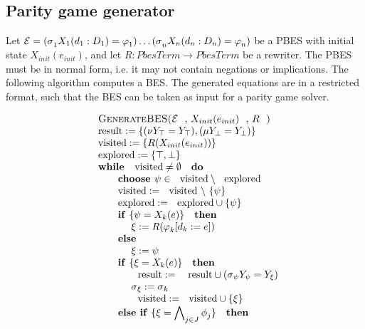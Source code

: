 \documentclass{article}
\begin{document}
\subsection{Parity game generator}

Let $\mathcal{E=(\sigma }_{1}X_{1}(d_{1}:D_{1})=\varphi _{1})\ldots \mathcal{%
(\sigma }_{n}X_{n}(d_{n}:D_{n})=\varphi _{n})$ be a PBES with initial state $%
X_{init}(e_{init})$, and let $R:PbesTerm\rightarrow PbesTerm$ be a rewriter.
The PBES must be in normal form, i.e. it may not contain negations or
implications. The following algorithm computes a BES. The generated
equations are in a restricted format, such that the BES can be taken as
input for a parity game solver.

{\small 
\begin{equation*}
\begin{array}{l}
\text{\textsc{GenerateBES(}}\mathcal{E}\text{, }X_{init}(e_{init})\text{, }R%
\text{\textsc{)}} \\ 
\text{result}:=\{(\nu Y_{\top }=Y_{\top }),(\mu Y_{\bot }=Y_{\bot })\} \\ 
\text{visited}:=\{R(X_{init}(e_{init}))\} \\ 
\text{explored}:=\{\top ,\bot \} \\ 
\text{\textbf{while }}\text{visited}\neq \emptyset \text{ \textbf{do}} \\ 
\qquad \text{\textbf{choose }}\psi \in \text{visited}\setminus \text{explored%
} \\ 
\qquad \text{visited}:=\text{visited}\ \backslash \ \{\psi \} \\ 
\qquad \text{explored}:=\text{explored}\cup \{\psi \} \\ 
\qquad \text{\textbf{if} }\{\psi =X_{k}(e)\}\text{ \textbf{then}} \\ 
\qquad \qquad \xi :=R(\varphi _{k}[d_{k}:=e]) \\ 
\qquad \text{\textbf{else}} \\ 
\qquad \qquad \xi :=\psi \\ 
\qquad \text{\textbf{if} }\{\xi =X_{k}(e)\}\text{ \textbf{then}} \\ 
\qquad \qquad \text{result}:=\text{ result}\cup (\sigma _{\psi }Y_{\psi
}=Y_{\xi }) \\ 
\qquad \qquad \sigma _{\xi }:=\sigma _{k} \\ 
\qquad \qquad \text{visited}:=\text{visited}\cup \{\xi \} \\ 
\qquad \text{\textbf{else if} }\{\xi =\dbigwedge_{j\in J}\phi _{j}\}\text{ 
\textbf{then}} \\ 

\end{array}
\end{equation*}}
\end{document}
